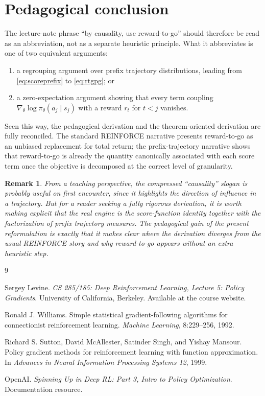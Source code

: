 \documentclass[11pt]{article}
\newtheorem{remark}{Remark}
\begin{document}
\section{Pedagogical conclusion}
The lecture-note phrase ``by causality, use reward-to-go'' should therefore be read as an abbreviation, not as a separate heuristic principle. What it abbreviates is one of two equivalent arguments:
\begin{enumerate}[label=(\alph*)]
    \item a regrouping argument over prefix trajectory distributions, leading from \eqref{eq:scoreprefix} to \eqref{eq:rtgpg}; or
    \item a zero-expectation argument showing that every term coupling $\nabla_\theta\log\pi_\theta(a_j\mid s_j)$ with a reward $r_t$ for $t<j$ vanishes.
\end{enumerate}
Seen this way, the pedagogical derivation and the theorem-oriented derivation are fully reconciled. The standard REINFORCE narrative presents reward-to-go as an unbiased replacement for total return; the prefix-trajectory narrative shows that reward-to-go is already the quantity canonically associated with each score term once the objective is decomposed at the correct level of granularity.

\begin{remark}
From a teaching perspective, the compressed ``causality'' slogan is probably useful on first encounter, since it highlights the direction of influence in a trajectory. But for a reader seeking a fully rigorous derivation, it is worth making explicit that the real engine is the score-function identity together with the factorization of prefix trajectory measures. The pedagogical gain of the present reformulation is exactly that it makes clear \emph{where} the derivation diverges from the usual REINFORCE story and \emph{why} reward-to-go appears without an extra heuristic step.
\end{remark}

\begin{thebibliography}{9}

Sergey Levine.
\newblock \emph{CS 285/185: Deep Reinforcement Learning, Lecture 5: Policy Gradients}.
\newblock University of California, Berkeley.
\newblock Available at the course website.

Ronald J. Williams.
\newblock Simple statistical gradient-following algorithms for connectionist reinforcement learning.
\newblock \emph{Machine Learning}, 8:229--256, 1992.

Richard S. Sutton, David McAllester, Satinder Singh, and Yishay Mansour.
\newblock Policy gradient methods for reinforcement learning with function approximation.
\newblock In \emph{Advances in Neural Information Processing Systems 12}, 1999.

OpenAI.
\newblock \emph{Spinning Up in Deep RL: Part 3, Intro to Policy Optimization}.
\newblock Documentation resource.

\end{thebibliography}
\end{document}
